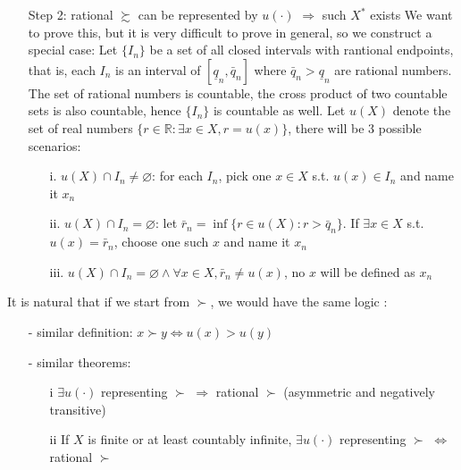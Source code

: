 \begin{enumerate}
    \item[Step 2:] rational $\succsim$ can be represented by $u(\cdot)$ $\Rightarrow$ such $X^*$ exists
    We want to prove this, but it is very difficult to prove in general, so we construct a special case: Let $\{I_n\}$ be a set of all closed intervals with rantional endpoints, that is, each $I_n$ is an interval of $[\underline{q}_n,\bar{q}_n]$ where $\bar{q}_n>\underline{q}_n$ are rational numbers.
    The set of rational numbers is countable, the cross product of two countable sets is also countable, hence $\{I_n\}$ is countable as well. Let $u(X)$ denote the set of real numbers $\{r\in \mathbb{R}: \exists x\in X, r=u(x)\}$, there will be 3 possible scenarios:
    \begin{enumerate}
        \item[i.] $u(X)\cap I_n\neq \varnothing$: for each $I_n$, pick one $x\in X$ s.t. $u(x)\in I_n$ and name it $x_n$
        \item[ii.] $u(X)\cap I_n =\varnothing$: let $\bar{r}_n=\inf \{r\in u(X):r>\bar{q}_n\}$. If $\exists x\in X$ s.t. $u(x)=\bar{r}_n$, choose one such $x$ and name it $x_n$
        \item[iii.] $u(X)\cap I_n=\varnothing\land \forall x\in X, \bar{r}_n\neq u(x)$, no $x$ will be defined as $x_n$
    \end{enumerate}
\end{enumerate}

It is natural that if we start from $\succ$, we would have the same logic \citep[See][Page 30]{kreps1990acourse}:

\begin{enumerate}
    \item[-] similar definition: $x\succ y\Leftrightarrow u(x)>u(y)$
    \item[-] similar theorems: 
    \begin{enumerate}
        \item[i] $\exists u(\cdot)$ representing $\succ$ $\Rightarrow$ rational $\succ$ (asymmetric and negatively transitive)
        \item[ii] If $X$ is finite or at least countably infinite, $\exists u(\cdot)$ representing $\succ$ $\Leftrightarrow$ rational $\succ$
    \end{enumerate} 
\end{enumerate}